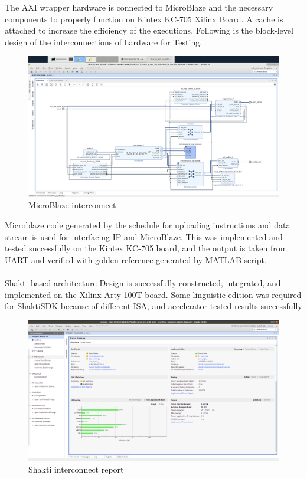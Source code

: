 The AXI wrapper hardware is connected to MicroBlaze and the necessary components to properly function on Kintex KC-705 Xilinx Board. A cache is attached to increase the efficiency of the executions. Following is the block-level design of the interconnections of hardware for Testing.\\



\begin{figure}[H]
    \centering
    \includegraphics[width = \textwidth]{./Software/Schematic_.png}
    \caption{MicroBlaze interconnect}
\end{figure}

Microblaze code generated by the schedule for uploading instructions and data stream is used for interfacing IP and MicroBlaze. This was implemented and tested successfully on the Kintex KC-705 board, and the output is taken from UART and verified with golden reference generated by MATLAB script.
\\
\\
Shakti-based architecture Design is successfully constructed, integrated, and implemented on the Xilinx Arty-100T board. Some linguistic edition was required for ShaktiSDK because of different ISA, and accelerator tested results successfully

\begin{figure}[H]
    \centering
    \includegraphics[width = \textwidth]{./Software/eclass.png}
    \caption{Shakti interconnect report}
\end{figure}

